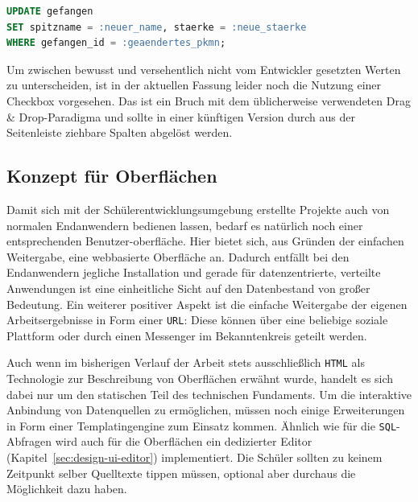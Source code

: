 \begin{lstlisting}[language=SQL,float=h!,caption={Syntax einer \texttt{UPDATE}-Anweisung}, label={lst:sql-syntax-update}]
UPDATE gefangen
SET spitzname = :neuer_name, staerke = :neue_staerke
WHERE gefangen_id = :geaendertes_pkmn;
\end{lstlisting}

Um zwischen bewusst und versehentlich nicht vom Entwickler gesetzten Werten zu unterscheiden, ist in der aktuellen Fassung leider noch die Nutzung einer Checkbox vorgesehen. Das ist ein Bruch mit dem üblicherweise verwendeten Drag \& Drop-Paradigma und sollte in einer künftigen Version durch aus der Seitenleiste ziehbare Spalten abgelöst werden.

\subsection{Konzept für Oberflächen}
\label{sec:design-ui-concept}

Damit sich mit der Schülerentwicklungsumgebung erstellte Projekte auch von normalen Endanwendern bedienen lassen, bedarf es natürlich noch einer entsprechenden Benutzer-oberfläche. Hier bietet sich, aus Gründen der einfachen Weitergabe, eine webbasierte Oberfläche an. Dadurch entfällt bei den Endanwendern jegliche Installation und gerade für datenzentrierte, verteilte Anwendungen ist eine einheitliche Sicht auf den Datenbestand von großer Bedeutung. Ein weiterer positiver Aspekt ist die einfache Weitergabe der eigenen Arbeitsergebnisse in Form einer \texttt{URL}: Diese können über eine beliebige soziale Plattform oder durch einen Messenger im Bekanntenkreis geteilt werden.


Auch wenn im bisherigen Verlauf der Arbeit stets ausschließlich \texttt{HTML} als Technologie zur Beschreibung von Oberflächen erwähnt wurde, handelt es sich dabei nur um den statischen Teil des technischen Fundaments. Um die interaktive Anbindung von Datenquellen zu ermöglichen, müssen noch einige Erweiterungen in Form einer Templatingengine zum Einsatz kommen. Ähnlich wie für die \texttt{SQL}-Abfragen wird auch für die Oberflächen ein dedizierter Editor (Kapitel~\ref{sec:design-ui-editor}) implementiert. Die Schüler sollten zu keinem Zeitpunkt selber Quelltexte tippen müssen, optional aber durchaus die Möglichkeit dazu haben.

